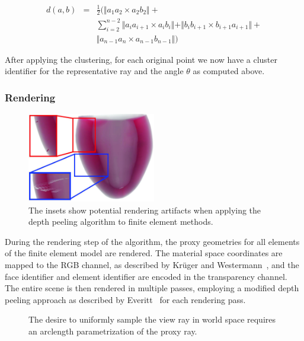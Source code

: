 \begin{eqnarray}
d(a,b) &=& \frac{1}{2} \Big( \Vert a_1a_2 \times a_2b_2\Vert + \nonumber \\
&& \sum_{i=2}^{n-2}\Vert a_ia_{i+1} \times a_ib_i \Vert + \Vert b_ib_{i+1} \times b_{i+1}a_{i+1}\Vert + \\
&& \Vert a_{n-1}a_n \times a_{n-1}b_{n-1}\Vert \Big) \nonumber 
\end{eqnarray}

After applying the clustering, for each original point we now have a cluster identifier for the representative ray and the angle $\theta$ as computed above.



\subsubsection{Rendering} \label{contributions:fem:rendering}
\begin{figure}
    \centering
    \includegraphics[width=0.5\textwidth]{figures/contributions/fem/heartfine.jpg}
    \caption{The insets show potential rendering artifacts when applying the depth peeling algorithm to finite element methods.}
    \label{contributions:fem:peeling}
\end{figure}
During the rendering step of the algorithm, the proxy geometries for all elements of the finite element model are rendered.  The material space coordinates are mapped to the RGB channel, as described by Kr\"uger and Westermann~\cite{kruger2003acceleration}, and the face identifier and element identifier are encoded in the transparency channel.  The entire scene is then rendered in multiple passes, employing a modified depth peeling approach as described by Everitt~\cite{everitt2001interactive} for each rendering pass.

\begin{figure}
\centering
{}
\caption{The desire to uniformly sample the view ray in world space requires an arclength parametrization of the proxy ray.}
\label{contributions:fem:arclength}
\end{figure}

